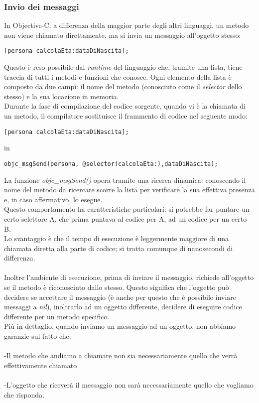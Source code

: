 \subsubsection{Invio dei messaggi}
In Objective-C, a differenza della maggior parte degli altri linguaggi, un metodo non viene chiamato direttamente, ma si invia un messaggio all'oggetto stesso: 
\lstset{language=[Objective]C, breakindent=40pt, breaklines}
\begin{lstlisting}
[persona calcolaEta:dataDiNascita];
\end{lstlisting}
Questo è reso possibile dal \textit{runtime} del linguaggio che, tramite una lista, tiene traccia di tutti i metodi e funzioni che conosce. Ogni elemento della lista è composto da due campi: il nome del metodo (conosciuto come il \textit{selector} dello stesso) e la sua locazione in memoria.
\\Durante la fase di compilazione del codice sorgente, quando vi è la chiamata di un metodo, il compilatore sostituisce il frammento di codice nel seguente modo:
\lstset{language=[Objective]C, breakindent=40pt, breaklines}
\begin{lstlisting}
[persona calcolaEta:dataDiNascita];
\end{lstlisting}
in \lstset{language=[Objective]C, breakindent=40pt, breaklines}
\begin{lstlisting}
objc_msgSend(persona, @selector(calcolaEta:),dataDiNascita);
\end{lstlisting}
\bigskip
\bigskip
La funzione \textit{objc\_msgSend()} opera tramite una ricerca dinamica: conoscendo il nome del metodo da ricercare scorre la lista per verificare la sua effettiva presenza e, in caso affermativo, lo esegue.\\ 
Questo comportamento ha caratteristiche particolari: si potrebbe far puntare un certo selettore A, che prima puntava al codice per A, ad un codice per un certo B.\\ 
Lo svantaggio è che il tempo di esecuzione è leggermente maggiore di una chiamata diretta alla parte di codice; si tratta comunque di nanosecondi di differenza.\\
\\Inoltre l'ambiente di esecuzione, prima di inviare il messaggio, richiede all’oggetto se il metodo è riconosciuto dallo stesso. Questo significa che l’oggetto può decidere se accettare il messaggio (è anche per questo che è possibile inviare messaggi a \textit{nil}), inoltrarlo ad un oggetto differente, decidere di eseguire codice differente per un metodo specifico.\\Più in dettaglio, quando inviamo un messaggio ad un oggetto, non abbiamo garanzie sul fatto che:\\ \\-Il metodo che andiamo a chiamare non sia necessariamente quello che verrà effettivamente chiamato\\\\-L’oggetto che riceverà il messaggio non sarà necessariamente quello che vogliamo che risponda.
